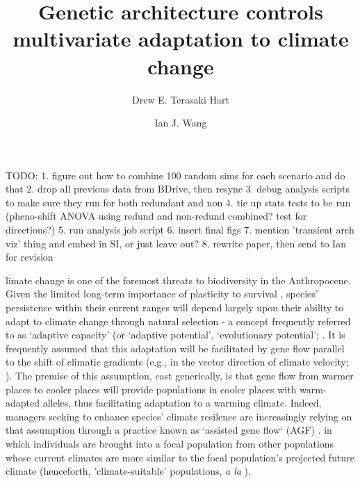 \documentclass[9pt,twocolumn,twoside,lineno]{pnas-new}
\title{Genetic architecture controls multivariate adaptation to climate change}
\author[a,1]{Drew E. Terasaki Hart}
\author[a]{Ian J. Wang}
\affil[a]{Department of Environmental Science, Policy, and Management, University of California, Berkeley, CA 94720}
\begin{document}
\maketitle
\thispagestyle{firststyle}


TODO:
1. figure out how to combine 100 random sims for each scenario and do that
2. drop all previous data from BDrive, then resync
3. debug analysis scripts to make sure they run for both redundant and non
4. tie up stats tests to be run (pheno-shift ANOVA using redund and non-redund combined? test for directions?)
5. run analysis job script
6. insert final figs
7. mention 'transient arch viz' thing and embed in SI, or just leave out?
8. rewrite paper, then send to Ian for revision



limate change is one of the foremost threats to biodiversity in the Anthropocene.
Given the limited long-term importance of plasticity to survival \cite{chevin},
species’ persistence within their current ranges will depend largely upon their ability to
adapt to climate change through natural selection - a concept frequently referred to 
as `adaptive capacity’ (or `adaptive potential’, `evolutionary potential’; 
\cite{chevin,harrisson,nicotra,vilas,wade}.
It is frequently assumed that this adaptation will be facilitated
by gene flow parallel to the shift of climatic gradients
(e.g., in the vector
direction of climate velocity; \cite{ackerly}).
The premise of this 
assumption, cast generically, is that gene flow from warmer places to
cooler places will provide populations in cooler places with warm-adapted alleles,
thus facilitating adaptation to a warming climate. 
Indeed, managers seeking to enhance species' climate resilence
are increasingly relying on that assumption
through a practice known as `assisted gene flow` (AGF) \cite{aitken_whitlock}.
in which individuals are brought into a focal population
from other populations whose current 
climates are more similar to the focal population's projected future climate
(henceforth, 'climate-suitable' populations, \textit{a la} \cite{bellis}).
\end{document}
